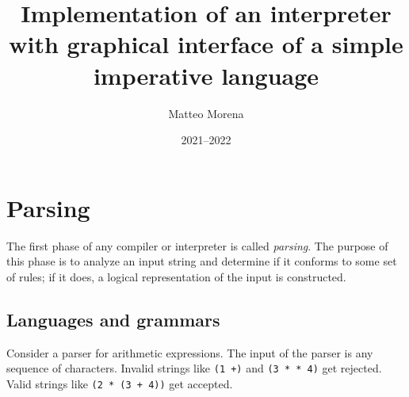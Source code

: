 \documentclass[11pt, american, draft]{PhdThesis}
\author{Matteo Morena}
\title{Implementation of an interpreter with graphical interface of a simple imperative language}
\date{2021--2022}
\begin{document}
  \pagestyle{empty}
  \maketitle




  \frontmatter
  \pagestyle{serif}
  \tableofcontents



  \mainmatter



  \chapter{Parsing}

  The first phase of any compiler or interpreter is called \emph{parsing}. The purpose of this
  phase is to analyze an input string and determine if it conforms to some set of rules; if it
  does, a logical representation of the input is constructed.

  \section{Languages and grammars}

  Consider a parser for arithmetic expressions. The input of the parser is any sequence of
  characters. Invalid strings like \verb$(1 +)$ and \verb$(3 * * 4)$ get rejected. Valid strings
  like \verb$(2 * (3 + 4))$ get accepted.
\end{document}
